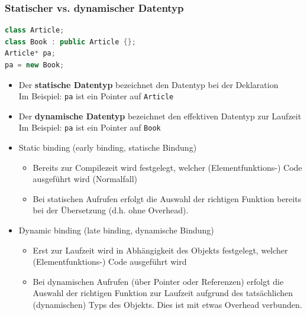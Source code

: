 \subsubsection{Statischer vs. dynamischer Datentyp}
\begin{lstlisting}[language=C++]
class Article;
class Book : public Article {};
Article* pa;
pa = new Book;
\end{lstlisting}
\begin{itemize}
  \item Der \textbf{statische Datentyp} bezeichnet den Datentyp bei der Deklaration\\
  Im Beispiel: \lstinline{pa} ist ein Pointer auf \lstinline{Article}
  \item Der \textbf{dynamische Datentyp} bezeichnet den effektiven Datentyp zur Laufzeit\\
  Im Beispiel: \lstinline{pa} ist ein Pointer auf \lstinline{Book}
\end{itemize}
\begin{itemize}
	\item Static binding (early binding, statische Bindung)
		\begin{itemize}
			\item Bereits zur Compilezeit wird festgelegt, welcher (Elementfunktions-) Code
				ausgeführt wird (Normalfall)
			\item Bei statischen Aufrufen erfolgt die Auswahl der richtigen Funktion bereits bei der Übersetzung (d.h. ohne Overhead).
		\end{itemize}
	\item Dynamic binding (late binding, dynamische Bindung)
		\begin{itemize}
			\item Erst zur Laufzeit wird in Abhängigkeit des Objekts festgelegt, welcher
				(Elementfunktions-) Code ausgeführt wird
      \item Bei dynamischen Aufrufen (über Pointer oder Referenzen) erfolgt die Auswahl der richtigen Funktion zur Laufzeit aufgrund des tatsächlichen (dynamischen) Typs des Objekts. Dies ist mit etwas Overhead verbunden.
		\end{itemize}
\end{itemize}

